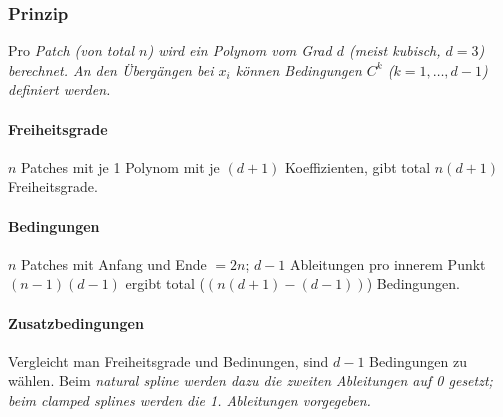 \subsubsection{Prinzip}
Pro \em Patch \em (von total $n$) wird ein Polynom vom Grad $d$ (meist kubisch, $d=3$) berechnet. An den Übergängen 
bei $x_i$ können Bedingungen $C^k$ ($k=1,\ldots, d-1$) definiert werden.

\paragraph{Freiheitsgrade}
$n$ Patches mit je 1 Polynom mit je $(d+1)$ Koeffizienten, gibt total $n(d+1)$ Freiheitsgrade.

\paragraph{Bedingungen}
$n$ Patches mit Anfang und Ende $=2n$;
$d-1$ Ableitungen pro innerem Punkt $(n-1)(d-1)$ ergibt total ($(n(d+1)-(d-1))$) Bedingungen.

\paragraph{Zusatzbedingungen}

Vergleicht man Freiheitsgrade und Bedinungen, sind $d-1$ Bedingungen zu wählen. Beim \em natural 
spline \em werden dazu die zweiten Ableitungen auf 0 gesetzt; beim \em clamped splines \em werden
die 1. Ableitungen vorgegeben.



